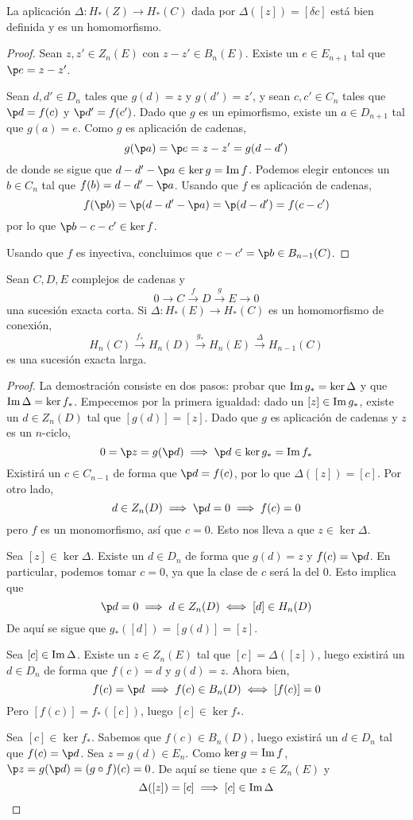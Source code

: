 \begin{proposition}
La aplicación $\Delta\colon H_*(Z) \longrightarrow H_*(C)$ dada por
$\Delta([z])=[\delta c]$ está bien definida y es un homomorfismo.
\end{proposition}

\begin{proof}
Sean $z,z' \in Z_n(E)$ con $z-z' \in B_n(E)$. Existe un $e \in E_{n+1}$ tal que
$\p e=z-z'$.

Sean $d,d' \in D_n$ tales que $g(d)=z$ y $g(d')=z'$, y sean $c,c' \in C_n$ tales
que $\p d=f(c)$ y $\p d'=f(c')$. Dado que $g$ es un epimorfismo, existe un
$a \in D_{n+1}$ tal que $g(a)=e$. Como $g$ es aplicación de cadenas,
\[g(\p a)=\p e=z-z'=g(d-d')\]
de donde se sigue que $d-d'-\p a\in \ker g=\im f$. Podemos elegir entonces un
$b \in C_n$ tal que $f(b)=d-d'-\p a$. Usando que $f$ es aplicación de cadenas,
\[f(\p b)=\p(d-d'-\p a)=\p (d- d')=f(c-c')\]
por lo que $\p b-c-c'\in\ker f$.

Usando que $f$ es inyectiva, concluimos que $c-c'=\p b \in B_{n-1}(C)$.
\end{proof}

\begin{theorem}
Sean $C, D, E$ complejos de cadenas y
\[0 \to C \xrightarrow{ f } D \xrightarrow{ g } E \to 0\]
una sucesión exacta corta. Si $\Delta\colon H_*(E) \to H_*(C)$ es un homomorfismo
de conexión,
\[H_n(C) \xrightarrow{ f_* } H_n(D) \xrightarrow{ g_* } H_n(E)
\xrightarrow{ \Delta } H_{n-1}(C)\] es una sucesión exacta larga.
\end{theorem}

\begin{proof}
La demostración consiste en dos pasos: probar que $\operatorname{Im} g_*=\ker \Delta$ y que
$\operatorname{Im} \Delta = \ker f_*$. Empecemos por la primera igualdad: dado un $[z] \in \operatorname{Im}
g_*$, existe un $d \in Z_n(D)$ tal que $[g(d)]=[z]$. Dado que $g$ es aplicación
de cadenas y $z$ es un $n$-ciclo,
\[0=\p z=g(\p d) \implies \p d \in \ker g_*=\im f_*\]
Existirá un $c \in C_{n-1}$ de forma que $\p d=f(c)$, por lo que $\Delta([z])=
[c]$. Por otro lado,
\[d \in Z_n(D) \implies \p d=0 \implies f(c)=0\]
pero $f$ es un monomorfismo, así que $c=0$. Esto nos lleva a que $z \in
\ker \Delta$.

Sea $[z] \in \ker \Delta$. Existe un $d \in D_n$ de forma que $g(d)=z$ y $f(c)=
\p d$. En particular, podemos tomar $c=0$, ya que la clase de $c$ será la del 0.
Esto implica que
\[\p d=0 \implies d \in Z_n(D) \iff [d] \in H_n(D)\]
De aquí se sigue que $g_*([d])=[g(d)]=[z]$.

Sea $[c] \in \operatorname{Im} \Delta$. Existe un $z \in Z_n(E)$ tal que $[c]=\Delta([z])$, luego
existirá un $d \in D_n$ de forma que $f(c)=d$ y $g(d)=z$. Ahora bien,
	\[f(c)= \p d \implies f(c) \in B_n(D) \iff [f(c)]=0\]
Pero $[f(c)]=f_*([c])$, luego $[c] \in \ker f_*$.

Sea $[c] \in \ker f_*$.
Sabemos que $f(c) \in B_n(D)$, luego existirá un $d \in D_n$ tal que $f(c)=\p d$. Sea $z=g(d) \in E_n$.
Como $\ker g=\operatorname{Im} f$, $\p z=g(\p d)=(g\circ f)(c)=0$.
	De aquí se tiene que $z \in Z_n(E)$ y
\[\Delta([z])=[c] \implies [c] \in \operatorname{Im} \Delta\]
\end{proof}
